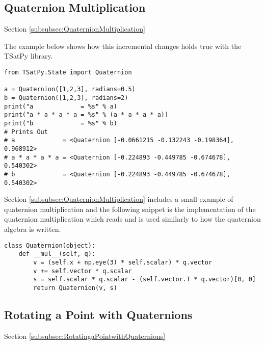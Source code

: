 \subsection{Quaternion Multiplication}
\label{subsec:Implementation-QuaternionMultiplication}

Section \ref{subsubsec:QuaternionMultiplication}

The example below shows how this incremental changes holds true with the TSatPy library.
\begin{singlespace}
  \begin{verbatim}
from TSatPy.State import Quaternion

a = Quaternion([1,2,3], radians=0.5)
b = Quaternion([1,2,3], radians=2)
print("a             = %s" % a)
print("a * a * a * a = %s" % (a * a * a * a))
print("b             = %s" % b)
# Prints Out
# a             = <Quaternion [-0.0661215 -0.132243 -0.198364], 0.968912>
# a * a * a * a = <Quaternion [-0.224893 -0.449785 -0.674678], 0.540302>
# b             = <Quaternion [-0.224893 -0.449785 -0.674678], 0.540302>
  \end{verbatim}
  \nocite{minted}
\end{singlespace}

Section \ref{subsubsec:QuaternionMultiplication} includes a small example of quaternion multiplication and the following snippet is the implementation of the quaternion multiplication which reads and is used similarly to how the quaternion algebra is written.

\begin{singlespace}
  \begin{verbatim}
class Quaternion(object):
    def __mul__(self, q):
        v = (self.x + np.eye(3) * self.scalar) * q.vector
        v += self.vector * q.scalar
        s = self.scalar * q.scalar - (self.vector.T * q.vector)[0, 0]
        return Quaternion(v, s)
  \end{verbatim}
  \nocite{minted}
\end{singlespace}

\subsection{Rotating a Point with Quaternions}
\label{subsec:Implementation-RotatingaPointwithQuaternions}

Section \ref{subsubsec:RotatingaPointwithQuaternions}


